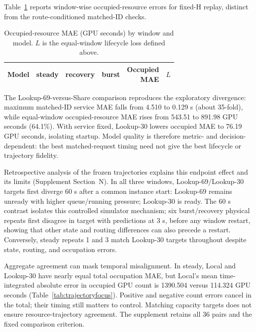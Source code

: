 Table~\ref{tab:modelerror} reports window-wise occupied-resource errors for
fixed-H replay, distinct from the route-conditioned matched-ID checks.

\begin{table}[t]
\centering
\small
\caption{Occupied-resource MAE (GPU seconds) by window and model. $L$ is the
equal-window lifecycle loss defined above.}
\label{tab:modelerror}
\setlength{\tabcolsep}{2pt}
\par\vspace{4pt}
\begin{tabular*}{\linewidth}{@{\extracolsep{\fill}}lrrrrr@{}}
\toprule
Model & steady & recovery & burst & \shortstack{Occupied\\MAE} & $L$\\
\midrule

\end{tabular*}
\end{table}

The Lookup-69-versus-Share comparison reproduces the exploratory divergence: maximum matched-ID
service MAE falls from 4.510 to 0.129 s (about 35-fold), while equal-window
occupied-resource MAE rises from 543.51 to 891.98 GPU seconds (64.1\%).
With service fixed, Lookup-30 lowers occupied MAE to 76.19 GPU seconds,
isolating startup. Model quality is therefore metric- and decision-dependent:
the best matched-request timing need not give the best lifecycle or trajectory
fidelity.

Retrospective analysis of the frozen trajectories explains this endpoint effect
and its limits (Supplement Section~N). In all three windows, Lookup-69/Lookup-30 targets first diverge
60 s after a common instance start: Lookup-69 remains unready with higher queue/running
pressure; Lookup-30 is ready. The 60 s contrast isolates this controlled simulator mechanism; six
burst/recovery physical repeats first disagree in target with predictions at 3 s,
before any window restart, showing that other state and routing differences can
also precede a restart. Conversely, steady
repeats 1 and 3 match Lookup-30 targets throughout despite state, routing, and
occupation errors.

Aggregate agreement can mask temporal misalignment. In steady, Local and Lookup-30 have
nearly equal total occupation MAE, but Local's mean time-integrated absolute error in
occupied GPU count is 1390.504 versus 114.324 GPU seconds (Table~\ref{tab:trajectoryfocus}).
Positive and negative count errors cancel in the total; their timing still
matters to control. Matching capacity targets does not ensure resource-trajectory agreement.
The supplement retains all 36 pairs and the fixed comparison criterion.

